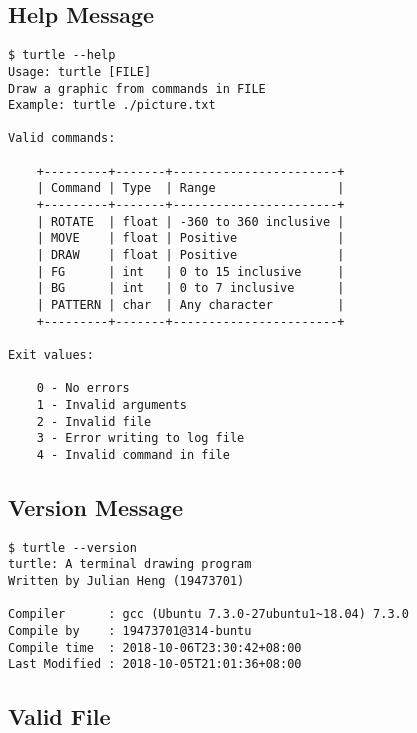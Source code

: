 \documentclass[a4paper, 12pt, titlepage]{article}
\begin{document}
\subsection{Help Message}

\begin{lstlisting}
$ turtle --help
Usage: turtle [FILE]
Draw a graphic from commands in FILE
Example: turtle ./picture.txt

Valid commands:

    +---------+-------+-----------------------+
    | Command | Type  | Range                 |
    +---------+-------+-----------------------+
    | ROTATE  | float | -360 to 360 inclusive |
    | MOVE    | float | Positive              |
    | DRAW    | float | Positive              |
    | FG      | int   | 0 to 15 inclusive     |
    | BG      | int   | 0 to 7 inclusive      |
    | PATTERN | char  | Any character         |
    +---------+-------+-----------------------+

Exit values:

    0 - No errors
    1 - Invalid arguments
    2 - Invalid file
    3 - Error writing to log file
    4 - Invalid command in file

\end{lstlisting}

\subsection{Version Message}

\begin{lstlisting}
$ turtle --version
turtle: A terminal drawing program
Written by Julian Heng (19473701)

Compiler      : gcc (Ubuntu 7.3.0-27ubuntu1~18.04) 7.3.0
Compile by    : 19473701@314-buntu
Compile time  : 2018-10-06T23:30:42+08:00
Last Modified : 2018-10-05T21:01:36+08:00
\end{lstlisting}

\subsection{Valid File}
\end{document}
